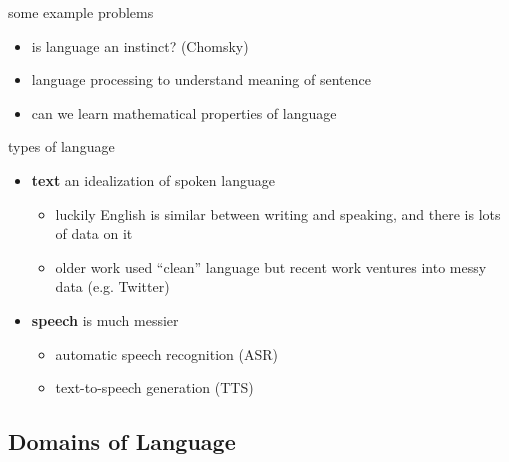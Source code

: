 \documentclass[]{article}
\theoremstyle{definition}
\begin{document}
some example problems
\begin{itemize}
    \item is language an instinct? (Chomsky)
    \item language processing to understand meaning of sentence
    \item can we learn mathematical properties of language
\end{itemize}

types of language
\begin{itemize}
    \item \textbf{text} an idealization of spoken language
        \begin{itemize}
            \item luckily English is similar between writing and speaking, and there is lots of data on it
            \item older work used ``clean'' language but recent work ventures into messy data (e.g. Twitter)
        \end{itemize}
    \item \textbf{speech} is much messier
        \begin{itemize}
            \item automatic speech recognition (ASR)
            \item text-to-speech generation (TTS)
        \end{itemize}
\end{itemize}

\subsection{Domains of Language}%
\label{sub:domains_of_language}
\end{document}
